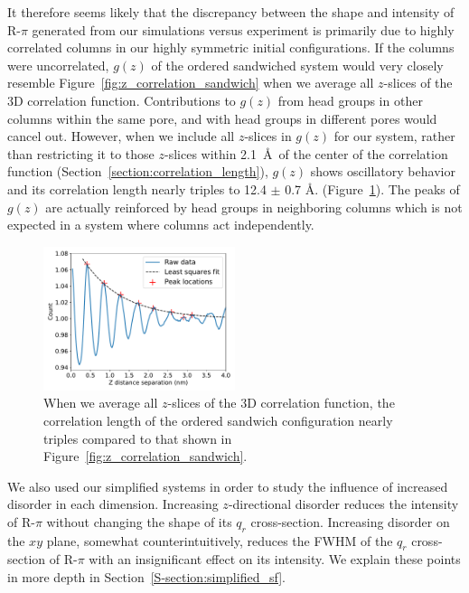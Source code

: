 \documentclass[journal=jpcbfk,manuscript=article]{achemso}
\begin{document}
  It therefore seems likely that the discrepancy between the shape and intensity of
  R-$\pi$ generated from our simulations versus experiment is primarily due to
  highly correlated columns in our highly symmetric initial configurations.
  If the columns were uncorrelated, $g(z)$ of the ordered sandwiched system 
  would very closely resemble Figure~\ref{fig:z_correlation_sandwich} when we 
  average all $z$-slices of the 3D correlation function. Contributions to
  $g(z)$ from head groups in other columns within the same pore, and with head
  groups in different pores would cancel out. However, when we include all 
  $z$-slices in $g(z)$ for our system, rather than restricting it to those 
  $z$-slices within 2.1~\AA~of the center of the correlation function 
  (Section~\ref{section:correlation_length}), $g(z)$ shows oscillatory 
  behavior and its correlation length nearly triples to 12.4 $\pm$ 0.7 \AA.
  (Figure~\ref{fig:z_correlation_fullbox}). The peaks of $g(z)$ are actually 
  reinforced by head groups in neighboring columns which is not expected
  in a system where columns act independently.

  \begin{figure}
  \centering
  \includegraphics[width=0.5\textwidth]{z_correlation_fullbox.pdf}
  \caption{When we average all $z$-slices of the 3D correlation function, the 
  correlation length of the ordered sandwich configuration nearly triples compared 
  to that shown in Figure~\ref{fig:z_correlation_sandwich}.}\label{fig:z_correlation_fullbox}
  \end{figure}
 
  We also used our simplified systems in order to study the influence of increased
  disorder in each dimension. Increasing $z$-directional disorder reduces the
  intensity of R-$\pi$ without changing the shape of its $q_r$ cross-section.
  Increasing disorder on the $xy$ plane, somewhat counterintuitively, reduces
  the FWHM of the $q_r$ cross-section of R-$\pi$ with an insignificant effect
  on its intensity. We explain these points in more depth in 
  Section~\ref{S-section:simplified_sf}.
\end{document}
